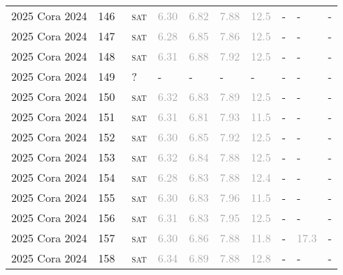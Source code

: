 \begin{center}
{\begin{longtable}{@{}llllllllll@{}}
2025 Cora 2024 & 146 & ~\textsc{sat} & \textcolor{darkgray}{6.30} & \textcolor{darkgray}{6.82} & \textcolor{darkgray}{7.88} & \textcolor{darkgray}{12.5} & - & - & - \\
2025 Cora 2024 & 147 & ~\textsc{sat} & \textcolor{darkgray}{6.28} & \textcolor{darkgray}{6.85} & \textcolor{darkgray}{7.86} & \textcolor{darkgray}{12.5} & - & - & - \\
2025 Cora 2024 & 148 & ~\textsc{sat} & \textcolor{darkgray}{6.31} & \textcolor{darkgray}{6.88} & \textcolor{darkgray}{7.92} & \textcolor{darkgray}{12.5} & - & - & - \\
2025 Cora 2024 & 149 & ~? & - & - & - & - & - & - & - \\
2025 Cora 2024 & 150 & ~\textsc{sat} & \textcolor{darkgray}{6.32} & \textcolor{darkgray}{6.83} & \textcolor{darkgray}{7.89} & \textcolor{darkgray}{12.5} & - & - & - \\
2025 Cora 2024 & 151 & ~\textsc{sat} & \textcolor{darkgray}{6.31} & \textcolor{darkgray}{6.81} & \textcolor{darkgray}{7.93} & \textcolor{darkgray}{11.5} & - & - & - \\
2025 Cora 2024 & 152 & ~\textsc{sat} & \textcolor{darkgray}{6.30} & \textcolor{darkgray}{6.85} & \textcolor{darkgray}{7.92} & \textcolor{darkgray}{12.5} & - & - & - \\
2025 Cora 2024 & 153 & ~\textsc{sat} & \textcolor{darkgray}{6.32} & \textcolor{darkgray}{6.84} & \textcolor{darkgray}{7.88} & \textcolor{darkgray}{12.5} & - & - & - \\
2025 Cora 2024 & 154 & ~\textsc{sat} & \textcolor{darkgray}{6.28} & \textcolor{darkgray}{6.83} & \textcolor{darkgray}{7.88} & \textcolor{darkgray}{12.4} & - & - & - \\
2025 Cora 2024 & 155 & ~\textsc{sat} & \textcolor{darkgray}{6.30} & \textcolor{darkgray}{6.83} & \textcolor{darkgray}{7.96} & \textcolor{darkgray}{11.5} & - & - & - \\
2025 Cora 2024 & 156 & ~\textsc{sat} & \textcolor{darkgray}{6.31} & \textcolor{darkgray}{6.83} & \textcolor{darkgray}{7.95} & \textcolor{darkgray}{12.5} & - & - & - \\
2025 Cora 2024 & 157 & ~\textsc{sat} & \textcolor{darkgray}{6.30} & \textcolor{darkgray}{6.86} & \textcolor{darkgray}{7.88} & \textcolor{darkgray}{11.8} & - & \textcolor{darkgray}{17.3} & - \\
2025 Cora 2024 & 158 & ~\textsc{sat} & \textcolor{darkgray}{6.34} & \textcolor{darkgray}{6.89} & \textcolor{darkgray}{7.88} & \textcolor{darkgray}{12.8} & - & - & - \\

\end{longtable}}
\end{center}
